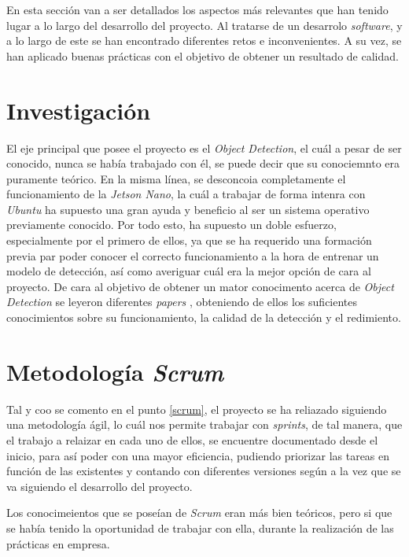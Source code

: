 
En esta sección van a ser detallados los aspectos más relevantes que han tenido lugar a lo largo del desarrollo del proyecto. Al tratarse de un desarrolo \textit{software}, y a lo largo de este se han encontrado diferentes retos e inconvenientes. A su vez, se han aplicado buenas prácticas con el objetivo de obtener un resultado de calidad.

\section{Investigación}
El eje principal que posee el proyecto es el \textit{Object Detection}, el cuál a pesar de ser conocido, nunca se había trabajado con él, se puede decir que su conociemnto era puramente teórico. En la misma línea, se desconcoia completamente el funcionamiento de la \textit{Jetson Nano}, la cuál a trabajar de forma intenra con \textit{Ubuntu} ha supuesto
una gran ayuda y beneficio al ser un sistema operativo previamente conocido.
Por todo esto, ha supuesto un doble esfuerzo, especialmente por el primero de ellos, ya que se ha requerido una formación previa par poder conocer el correcto funcionamiento a la hora de entrenar un modelo de detección, así como averiguar cuál era la mejor opción de cara al proyecto.
De cara al objetivo de obtener un mator conocimento acerca de \textit{Object Detection} se leyeron diferentes \textit{papers} \cite{Pathak2018,Yang2017, Wu2020}, obteniendo de ellos los suficientes conocimientos sobre su funcionamiento, la calidad de la detección y el redimiento.

\section{Metodología \textit{Scrum}}
Tal y coo se comento en el punto \ref{scrum}, el proyecto se ha reliazado siguiendo una metodología ágil, lo cuál nos permite trabajar con \textit{sprints}, de tal manera, que el trabajo a relaizar en cada uno de ellos, se encuentre documentado desde el inicio, para así poder con una mayor eficiencia, pudiendo priorizar las tareas en función de las existentes y contando con diferentes versiones según a la vez que se va siguiendo el desarrollo del proyecto.

Los conocimeientos que se poseían de \textit{Scrum} eran más bien teóricos, pero si que se había tenido la oportunidad de trabajar con ella, durante la realización de las prácticas en empresa.

